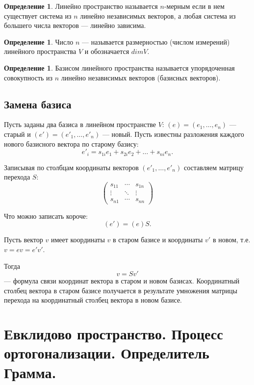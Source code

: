 \documentclass[12pt]{report}
\theoremstyle{definition}
\newtheorem{definition}[theorem]{Определение}
\begin{document}
\begin{definition}
Линейно пространство называется $n$-мерным если в нем существует система из
$n$ линейно независимых векторов, а любая система из большего числа векторов
--- линейно зависима.
\end{definition}

\begin{definition}
Число $n$ --- называется размерностью (числом измерений) линейного
пространства $V$ и обозначается $dim V$.
\end{definition}

\begin{definition}
Базисом линейного пространства называется упорядоченная совокупность
из $n$ линейно независимых векторов (базисных векторов).
\end{definition}

\subsection{Замена базиса}

Пусть заданы два базиса в линейном пространстве $V$:
$(e) = (e_1, \dots, e_n)$ --- старый и $(e') = (e'_1, \dots, e'_n)$ --- новый.
Пусть известны разложения каждого нового базисного вектора по старому базису:
$$
e'_i = s_{1i} e_1 + s_{2i} e_2 + \dots + s_{ni} e_n.
$$

Записывая по столбцам координаты векторов $(e'_1, \dots, e'_n)$  составляем матрицу
перехода $S$:
$$
\begin{pmatrix} 
s_{11} & \cdots & s_{1n}
\\ \vdots & \ddots & \vdots
\\ s_{n1} & \cdots & s_{nn}
\end{pmatrix}
$$

Что можно записать короче:
$$
(e') = (e) S.
$$

Пусть вектор $v$ имеет координаты $v$ в старом базисе и координаты
$v'$ в новом, т.е. $v = e v = e' v'$.

Тогда
$$
v = S v'
$$ --- формула связи координат вектора в старом и новом базисах.
Координатный столбец вектора в старом базисе получается в результате умножения
матрицы перехода на координатный столбец вектора в новом базисе.


\section{Евклидово пространство. Процесс ортогонализации. Определитель Грамма.}
\end{document}
